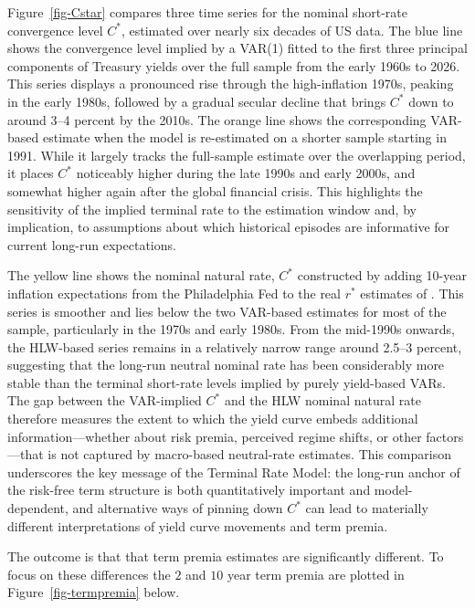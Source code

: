\documentclass[
  letterpaper,
  DIV=11,
  numbers=noendperiod]{scrreprt}
\begin{document}
Figure~\ref{fig-Cstar} compares three time series for the nominal
short-rate convergence level \(C^{\ast}\), estimated over nearly six
decades of US data. The blue line shows the convergence level implied by
a VAR(1) fitted to the first three principal components of Treasury
yields over the full sample from the early 1960s to 2026. This series
displays a pronounced rise through the high-inflation 1970s, peaking in
the early 1980s, followed by a gradual secular decline that brings
\(C^{\ast}\) down to around 3--4 percent by the 2010s. The orange line
shows the corresponding VAR-based estimate when the model is
re-estimated on a shorter sample starting in 1991. While it largely
tracks the full-sample estimate over the overlapping period, it places
\(C^{\ast}\) noticeably higher during the late 1990s and early 2000s,
and somewhat higher again after the global financial crisis. This
highlights the sensitivity of the implied terminal rate to the
estimation window and, by implication, to assumptions about which
historical episodes are informative for current long-run expectations.

The yellow line shows the nominal natural rate, \(C^{\ast}\) constructed
by adding 10-year inflation expectations from the Philadelphia Fed to
the real \(r^{\ast}\) estimates of . This series is smoother and lies
below the two VAR-based estimates for most of the sample, particularly
in the 1970s and early 1980s. From the mid-1990s onwards, the HLW-based
series remains in a relatively narrow range around 2.5--3 percent,
suggesting that the long-run neutral nominal rate has been considerably
more stable than the terminal short-rate levels implied by purely
yield-based VARs. The gap between the VAR-implied \(C^{\ast}\) and the
HLW nominal natural rate therefore measures the extent to which the
yield curve embeds additional information---whether about risk premia,
perceived regime shifts, or other factors---that is not captured by
macro-based neutral-rate estimates. This comparison underscores the key
message of the Terminal Rate Model: the long-run anchor of the risk-free
term structure is both quantitatively important and model-dependent, and
alternative ways of pinning down \(C^{\ast}\) can lead to materially
different interpretations of yield curve movements and term premia.

The outcome is that that term premia estimates are significantly
different. To focus on these differences the \(2\) and \(10\) year term
premia are plotted in Figure~\ref{fig-termpremia} below.
\end{document}
